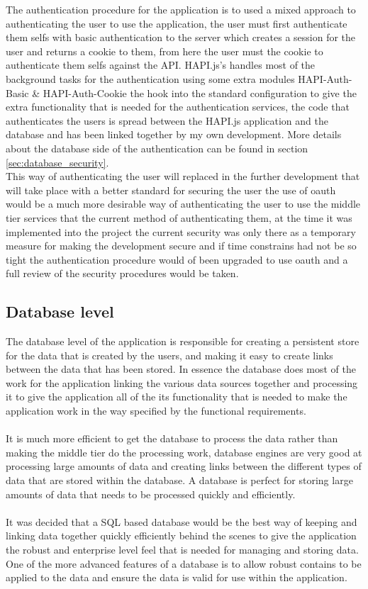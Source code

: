 The authentication procedure for the application is to used a mixed approach to authenticating the user to use the application, the user must first authenticate them selfs with basic authentication to the server which creates a session for the user and returns a cookie to them, from here the user must the cookie to authenticate them selfs against the API. HAPI.js's handles most of the background tasks for the authentication using some extra modules HAPI-Auth-Basic \& HAPI-Auth-Cookie the hook into the standard configuration to give the extra functionality that is needed for the authentication services, the code that authenticates the users is spread between the HAPI.js application and the database and has been linked together by my own development. More details about the database side of the authentication can be found in section \ref{sec:database_security}.
\\
This way of authenticating the user will replaced in the further development that will take place with a better standard for securing the user the use of oauth would be a much more desirable way of authenticating the user to use the middle tier services that the current method of authenticating them, at the time it was implemented into the project the current security was only there as a temporary measure for making the development secure and if time constrains had not be so tight the authentication procedure would of been upgraded to use oauth and a full review of the security procedures would be taken.

\subsection{Database level}

The database level of the application is responsible for creating a persistent store for the data that is created by the users, and making it easy to create links between the data that has been stored. In essence the database does most of the work for the application linking the various data sources together and processing it to give the application all of the its functionality that is needed to make the application work in the way specified by the functional requirements.\\
\\
It is much more efficient to get the database to process the data rather than making the middle tier do the processing work, database engines are very good at processing large amounts of data and creating links between the different types of data that are stored within the database. A database is perfect for storing large amounts of data that needs to be processed quickly and efficiently.\\
\\
It was decided that a SQL based database would be the best way of keeping and linking data together quickly efficiently behind the scenes to give the application the robust and enterprise level feel that is needed for managing and storing data. One of the more advanced features of a database is to allow robust contains to be applied to the data and ensure the data is valid for use within the application.

